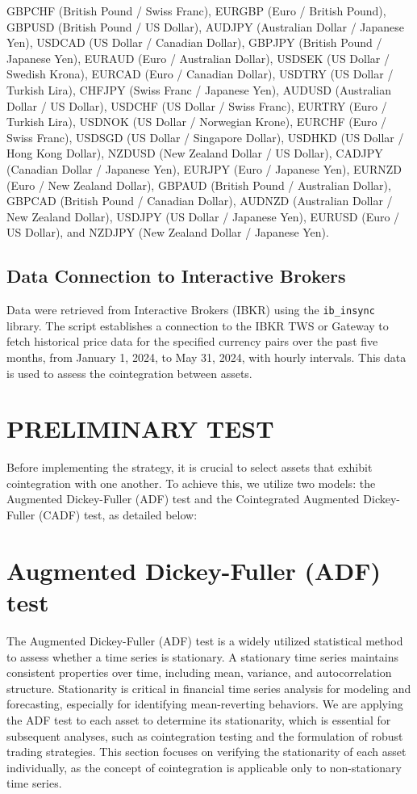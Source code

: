 \documentclass{article}
\begin{document}
GBPCHF (British Pound / Swiss Franc), EURGBP (Euro / British Pound), GBPUSD (British Pound / US Dollar), AUDJPY (Australian Dollar / Japanese Yen), USDCAD (US Dollar / Canadian Dollar), GBPJPY (British Pound / Japanese Yen), EURAUD (Euro / Australian Dollar), USDSEK (US Dollar / Swedish Krona), EURCAD (Euro / Canadian Dollar), USDTRY (US Dollar / Turkish Lira), CHFJPY (Swiss Franc / Japanese Yen), AUDUSD (Australian Dollar / US Dollar), USDCHF (US Dollar / Swiss Franc), EURTRY (Euro / Turkish Lira), USDNOK (US Dollar / Norwegian Krone), EURCHF (Euro / Swiss Franc), USDSGD (US Dollar / Singapore Dollar), USDHKD (US Dollar / Hong Kong Dollar), NZDUSD (New Zealand Dollar / US Dollar), CADJPY (Canadian Dollar / Japanese Yen), EURJPY (Euro / Japanese Yen), EURNZD (Euro / New Zealand Dollar), GBPAUD (British Pound / Australian Dollar), GBPCAD (British Pound / Canadian Dollar), AUDNZD (Australian Dollar / New Zealand Dollar), USDJPY (US Dollar / Japanese Yen), EURUSD (Euro / US Dollar), and NZDJPY (New Zealand Dollar / Japanese Yen).

\subsection*{Data Connection to Interactive Brokers}
Data were retrieved from Interactive Brokers (IBKR) using the \texttt{ib\_insync} library. The script establishes a connection to the IBKR TWS or Gateway to fetch historical price data for the specified currency pairs over the past five months, from January 1, 2024, to May 31, 2024, with hourly intervals. This data is used to assess the cointegration between assets.

\section{PRELIMINARY TEST}
Before implementing the strategy, it is crucial to select assets that exhibit cointegration with one another. To achieve this, we utilize two models: the Augmented Dickey-Fuller (ADF) test and the Cointegrated Augmented Dickey-Fuller (CADF) test, as detailed below:

\section*{Augmented Dickey-Fuller (ADF) test}
The Augmented Dickey-Fuller (ADF) test is a widely utilized statistical method to assess whether a time series is stationary. A stationary time series maintains consistent properties over time, including mean, variance, and autocorrelation structure. Stationarity is critical in financial time series analysis for modeling and forecasting, especially for identifying mean-reverting behaviors.
We are applying the ADF test to each asset to determine its stationarity, which is essential for subsequent analyses, such as cointegration testing and the formulation of robust trading strategies. This section focuses on verifying the stationarity of each asset individually, as the concept of cointegration is applicable only to non-stationary time series.
\end{document}
